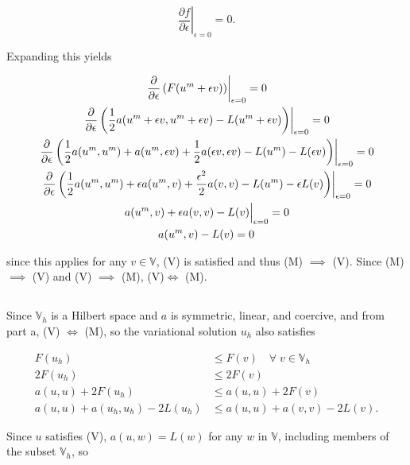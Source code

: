 \documentclass{hw-template}
\begin{document}
\begin{equation}
    \left.\frac{\partial f}{\partial \epsilon} \right|_{\epsilon = 0} = 0.
\end{equation}

Expanding this yields

\begin{gather}
     \left.\frac{\partial }{\partial \epsilon} \left( F(u^m + \epsilon v) \right) \right|_{\epsilon = 0} =0 \\
     \left.\frac{\partial }{\partial \epsilon}\left( \frac{1}{2} a(u^m + \epsilon v, u^m + \epsilon v) - L(u^m + \epsilon v) \right) \right|_{\epsilon = 0} =0\\
     \left.\frac{\partial }{\partial \epsilon}\left( \frac{1}{2} a(u^m, u^m) + a(u^m, \epsilon v) + \frac{1}{2}a(\epsilon v, \epsilon v) - L(u^m) - L(\epsilon v) \right) \right|_{\epsilon = 0}=0\\
     \left.\frac{\partial }{\partial \epsilon}\left( \frac{1}{2} a(u^m, u^m) + \epsilon a(u^m,  v) + \frac{\epsilon^2}{2}a( v,  v) - L(u^m) - \epsilon L( v) \right) \right|_{\epsilon = 0}=0\\
     \left. \vphantom{\frac{}{}} a(u^m, v) + \epsilon a(v, v) - L(v) \right|_{\epsilon = 0}=0\\
      a(u^m, v)  - L(v) =0
\end{gather}

since this applies for any $v \in \mathbb{V}$, (V) is satisfied and thus (M) $\implies$ (V). Since (M) $\implies$ (V) and (V) $\implies$ (M), (V)$\iff$ (M).

\subsection{} Since $\mathbb{V}_h$ is a Hilbert space and $a$ is symmetric, linear, and coercive, and from part a, {(V) $\iff$ (M)}, so the variational solution $u_h$ also satisfies

\begin{align}
    F(u_h) &\leq F(v) \quad \forall\; v \in \mathbb{V}_h\\
    2F(u_h) &\leq 2F(v) \\
    a(u, u) + 2F(u_h) &\leq a(u, u) +  2F(v) \\
    a(u, u) + a(u_h, u_h) - 2L(u_h) &\leq a(u, u) +  a(v, v) - 2L(v).
\end{align}

Since $u$ satisfies (V), $a(u, w) = L(w)$ for any $w$ in $\mathbb{V}$, including members of the subset $\mathbb{V}_h$, so 
\end{document}
